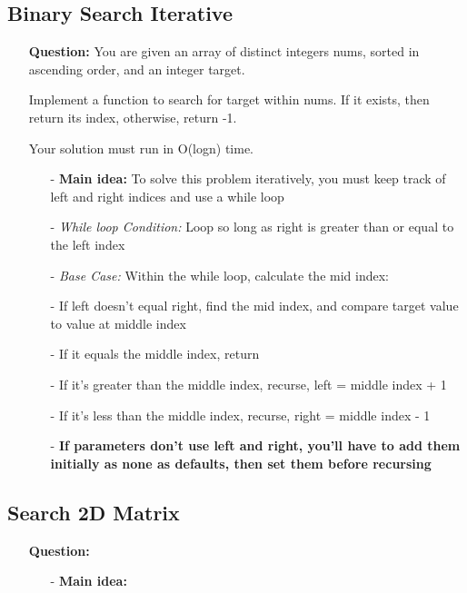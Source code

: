 \documentclass[12pt]{article}
\begin{document}
\subsection{Binary Search Iterative}
\begin{enumerate}
  \item[] \textbf{Question:}  You are given an array of distinct integers nums, sorted in ascending order, and an integer target.

Implement a function to search for target within nums. If it exists, then return its index, otherwise, return -1.

Your solution must run in O(logn) time.

    \begin{enumerate}
      \item[-] \textbf{Main idea:} To solve this problem iteratively, you must keep track of left and right indices and use a while loop
      \item[-] \textit{While loop Condition:} Loop so long as right is greater than or equal to the left index 
      \item[-] \textit{Base Case: } Within the while loop, calculate the mid index: \textbf{}
      \item[-] If left doesn't equal right, find the mid index, and compare target value to value at middle index
      \item[-] If it equals the middle index, return
      \item[-] If it's greater than the middle index, recurse, left = middle index + 1
      \item[-] If it's less than the middle index, recurse, right = middle index - 1
      \item[-] \textbf{If parameters don't use left and right, you'll have to add them initially as none as defaults, then set them before recursing}


    \end{enumerate}
\end{enumerate}
\subsection{Search 2D Matrix}
\begin{enumerate}
  \item[] \textbf{Question:} 
    \begin{enumerate}
      \item[-] \textbf{Main idea:} 

    \end{enumerate}
\end{enumerate}
\end{document}
